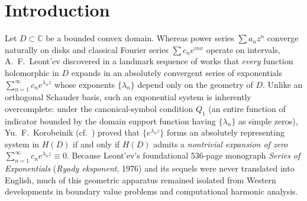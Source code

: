\documentclass[11pt,reqno]{amsart}
\theoremstyle{definition}
\theoremstyle{remark}
\newcommand{\C}{\mathbb{C}}
\begin{document}
\maketitle

\section{Introduction}

Let $D \subset \C$ be a bounded convex domain. Whereas power series $\sum a_n z^n$ converge naturally on disks and classical Fourier series $\sum c_n e^{inx}$ operate on intervals, A.~F.~Leont'ev discovered in a landmark sequence of works \cite{Leontev1969UMN,Leontev1969MatSb,Leontev1973Izv,Leontev1974Polygon,Leontev1976Book,Leontev1987TrMIAN} that \emph{every} function holomorphic in $D$ expands in an absolutely convergent series of exponentials $\sum_{n=1}^\infty c_n e^{\lambda_n z}$ whose exponents $\{\lambda_n\}$ depend only on the geometry of $D$. Unlike an orthogonal Schauder basis, such an exponential system is inherently overcomplete: under the canonical-symbol condition $Q_1$ (an entire function of indicator bounded by the domain support function having $\{\lambda_n\}$ as simple zeros), Yu.~F.~Korobeinik \cite[Ch.~III, \S 1, Theorem~6]{Korobeinik1981UMN} (cf.\ \cite{Korobeinik1975}) proved that $\{e^{\lambda_n z}\}$ forms an absolutely representing system in $H(D)$ if and only if $H(D)$ admits a \emph{nontrivial expansion of zero} $\sum_{n=1}^\infty c_n e^{\lambda_n z} \equiv 0$. Because Leont'ev's foundational 536-page monograph \emph{Series of Exponentials} (\emph{Ryady eksponent}, 1976) \cite{Leontev1976Book} and its sequels were never translated into English, much of this geometric apparatus remained isolated from Western developments in boundary value problems and computational harmonic analysis.
\end{document}
